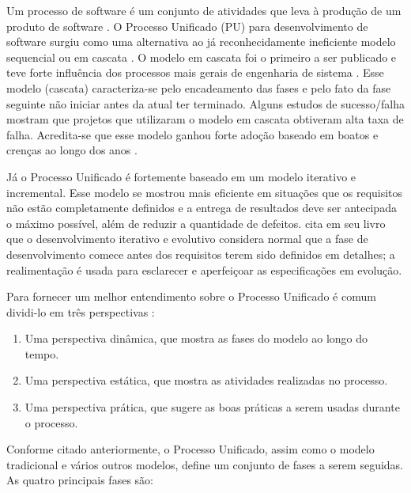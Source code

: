 \documentclass[
	article,			%
	11pt,				%
	oneside,			%
	a4paper,			%
	english,			%
	brazil,				%
	sumario=tradicional
	]{abntex2}
\begin{document}
\label{processo-unificado}

Um processo de software é um conjunto de atividades que leva à produção de um
produto de software \cite{sommerville2007}. O Processo Unificado (PU) para
desenvolvimento de software surgiu como uma alternativa ao já reconhecidamente
ineficiente modelo sequencial ou em cascata \cite{jacobson1999unified}.
O modelo em cascata foi o primeiro a ser publicado e teve forte influência dos
processos mais gerais de engenharia de sistema \cite{sommerville2007}. Esse
modelo (cascata) caracteriza-se pelo encadeamento das fases e pelo fato da fase
seguinte não iniciar antes da atual ter terminado. Alguns estudos de
sucesso/falha mostram que projetos que utilizaram o modelo em cascata obtiveram
alta taxa de falha. Acredita-se que esse modelo ganhou forte adoção baseado em
boatos e crenças ao longo dos anos \cite{larman2007utilizando}.

Já o Processo Unificado é fortemente baseado em um modelo
iterativo e incremental. Esse modelo se mostrou mais eficiente em situações que os
requisitos não estão completamente definidos e a entrega de resultados deve ser
antecipada o máximo possível, além de reduzir a quantidade de defeitos.
 cita em seu livro que o desenvolvimento
iterativo e evolutivo considera normal que a fase de desenvolvimento comece
antes dos requisitos terem sido definidos em detalhes; a realimentação é usada
para esclarecer e aperfeiçoar as especificações em evolução.

Para fornecer um melhor entendimento sobre o Processo Unificado é comum
dividi-lo em três perspectivas \cite{sommerville2007}:

\begin{enumerate}
   \item Uma perspectiva dinâmica, que mostra as fases do modelo ao longo do
   tempo.
   \item Uma perspectiva  estática, que mostra as atividades realizadas no
   processo.
   \item Uma perspectiva prática, que sugere as boas práticas a serem usadas
   durante o processo.
\end{enumerate}

Conforme citado anteriormente, o Processo Unificado, assim como o modelo
tradicional e vários outros modelos, define um conjunto de fases a serem
seguidas. As quatro principais fases são:
\end{document}
